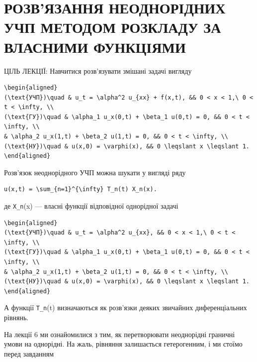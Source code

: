 \documentclass[
  ukrainian,
]{article}
\begin{document}
\section{РОЗВ'ЯЗАННЯ НЕОДНОРІДНИХ УЧП МЕТОДОМ РОЗКЛАДУ ЗА ВЛАСНИМИ
ФУНКЦІЯМИ}\label{ux440ux43eux437ux432ux44fux437ux430ux43dux43dux44f-ux43dux435ux43eux434ux43dux43eux440ux456ux434ux43dux438ux445-ux443ux447ux43f-ux43cux435ux442ux43eux434ux43eux43c-ux440ux43eux437ux43aux43bux430ux434ux443-ux437ux430-ux432ux43bux430ux441ux43dux438ux43cux438-ux444ux443ux43dux43aux446ux456ux44fux43cux438}

ЦІЛЬ ЛЕКЦІЇ: Навчитися розв'язувати змішані задачі вигляду

\begin{verbatim}
\begin{aligned}
(\text{УЧП})\quad & u_t = \alpha^2 u_{xx} + f(x,t), && 0 < x < 1,\ 0 < t < \infty, \\
(\text{ГУ})\quad & \alpha_1 u_x(0,t) + \beta_1 u(0,t) = 0, && 0 < t < \infty, \\
& \alpha_2 u_x(1,t) + \beta_2 u(1,t) = 0, && 0 < t < \infty, \\
(\text{НУ})\quad & u(x,0) = \varphi(x), && 0 \leqslant x \leqslant 1.
\end{aligned}
\end{verbatim}

Розв'язок неоднорідного УЧП можна шукати у вигляді ряду

\begin{verbatim}
u(x,t) = \sum_{n=1}^{\infty} T_n(t) X_n(x).
\end{verbatim}

де \texttt{X\_n}(x) --- власні функції відповідної однорідної задачі

\begin{verbatim}
\begin{aligned}
(\text{УЧП})\quad & u_t = \alpha^2 u_{xx}, && 0 < x < 1,\ 0 < t < \infty, \\
(\text{ГУ})\quad & \alpha_1 u_x(0,t) + \beta_1 u(0,t) = 0, && 0 < t < \infty, \\
& \alpha_2 u_x(1,t) + \beta_2 u(1,t) = 0, && 0 < t < \infty, \\
(\text{НУ})\quad & u(x,0) = \varphi(x), && 0 \leqslant x \leqslant 1.
\end{aligned}
\end{verbatim}

А функції \texttt{T\_n}(t) визначаються як розв'язки деяких звичайних
диференціальних рівнянь.

На лекції 6 ми ознайомилися з тим, як перетворювати неоднорідні граничні
умови на однорідні. На жаль, рівняння залишається гетерогенним, і ми
стоїмо перед завданням
\end{document}
